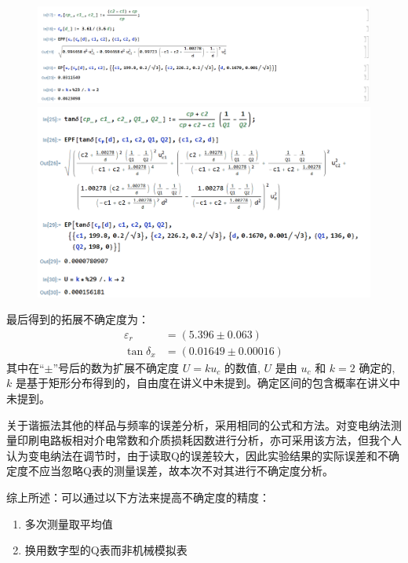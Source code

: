 \documentclass[a4paper,utf8]{article}
\begin{document}
        \begin{figure}[!ht]\centering
            \includegraphics[width=150mm]{result.png}
            \includegraphics[width=150mm]{result2.png}
        \end{figure}
        最后得到的拓展不确定度为：
        \begin{align}
            \varepsilon_r &= ( 5.396 \pm 0.063 ) \\
            \tan \delta_x &= ( 0.01649 \pm 0.00016 )
        \end{align}
        其中在“$\pm$”号后的数为扩展不确定度 $U=ku_c$ 的数值, $ U $ 是由 $ u_c $ 和 $ k = 2 $ 确定的, $k$ 是基于矩形分布得到的，自由度在讲义中未提到。确定区间的包含概率在讲义中未提到。\par
        关于谐振法其他的样品与频率的误差分析，采用相同的公式和方法。对变电纳法测量印刷电路板相对介电常数和介质损耗因数进行分析，亦可采用该方法，但我个人认为变电纳法在调节时，由于读取Q的误差较大，因此实验结果的实际误差和不确定度不应当忽略Q表的测量误差，故本次不对其进行不确定度分析。 \par
        综上所述：可以通过以下方法来提高不确定度的精度：
        \begin{enumerate}
            \item 多次测量取平均值
            \item 换用数字型的Q表而非机械模拟表
        \end{enumerate}
\end{document}

